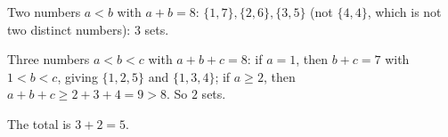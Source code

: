 Two numbers $a<b$ with $a+b=8$: $\{1,7\},\{2,6\},\{3,5\}$ (not $\{4,4\}$, which is not two distinct numbers): $3$ sets.

Three numbers $a<b<c$ with $a+b+c=8$: if $a=1$, then $b+c=7$ with $1<b<c$, giving $\{1,2,5\}$ and $\{1,3,4\}$; if $a\ge2$, then $a+b+c\ge2+3+4=9>8$. So $2$ sets.

The total is $3+2=\boxed{5}$.
